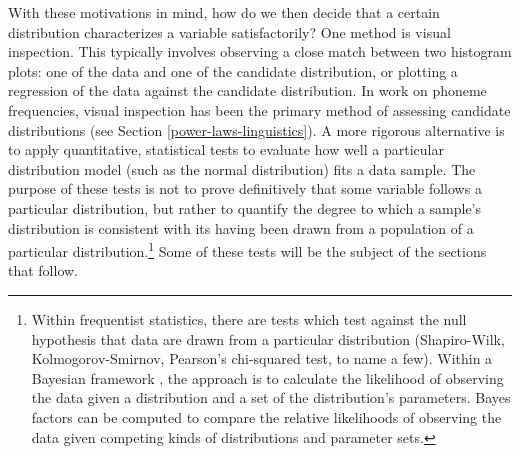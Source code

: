 With these motivations in mind, how do we then decide that a certain distribution characterizes a variable satisfactorily? One method is visual inspection. This typically involves observing a close match between two histogram plots: one of the data and one of the candidate distribution, or plotting a regression of the data against the candidate distribution. In work on phoneme frequencies, visual inspection has been the primary method of assessing candidate distributions (see Section \ref{power-laws-linguistics}). A more rigorous alternative is to apply quantitative, statistical tests to evaluate how well a particular distribution model (such as the normal distribution) fits a data sample. The purpose of these tests is not to prove definitively that some variable follows a particular distribution, but rather to quantify the degree to which a sample's distribution is consistent with its having been drawn from a population of a particular distribution.\footnote{Within frequentist statistics, there are tests which test against the null hypothesis that data are drawn from a particular distribution (Shapiro-Wilk, Kolmogorov-Smirnov, Pearson's chi-squared test, to name a few). Within a Bayesian framework \autocites{spiegelhalter_omnibus_1980}{farrell_comprehensive_2006}, the approach is to calculate the likelihood of observing the data given a distribution and a set of the distribution's parameters. Bayes factors can be computed to compare the relative likelihoods of observing the data given competing kinds of distributions and parameter sets.} Some of these tests will be the subject of the sections that follow.

